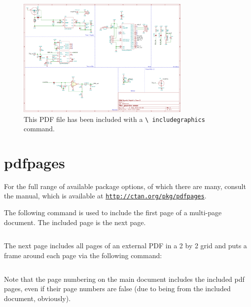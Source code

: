 \documentclass[a4paper,oneside]{article}
\newcommand\code[1]{\texttt{#1}}
\begin{document}
\begin{figure}[h!]
    \centering
    \includegraphics[width=0.75\textwidth]{includes/a4.pdf}
    \caption{%
        This  PDF   file  has   been  included  with   a  \code{\textbackslash
        includegraphics} command.}
    \label{fig:includegraphics}
\end{figure}


\clearpage
\section{pdfpages}
\label{sec:pdfpages}

For   the    full   range   of    available   package   options,    of   which
there   are    many,   consult   the    manual,   which   is    available   at
\href{http://ctan.org/pkg/pdfpages}{\nolinkurl{http://ctan.org/pkg/pdfpages}}.

The  following command  is used  to  include the  first page  of a  multi-page
document.  The included page is the next page.

\begin{verbatim}

\end{verbatim}



The next page includes all pages of an external  PDF in a 2 by 2 grid and puts
a frame around each page via the following command:

\begin{verbatim}

\end{verbatim}

Note that  the page numbering on  the main document includes  the included pdf
pages, even if  their page numbers are  false (due to being  from the included
document, obviously).
\end{document}
